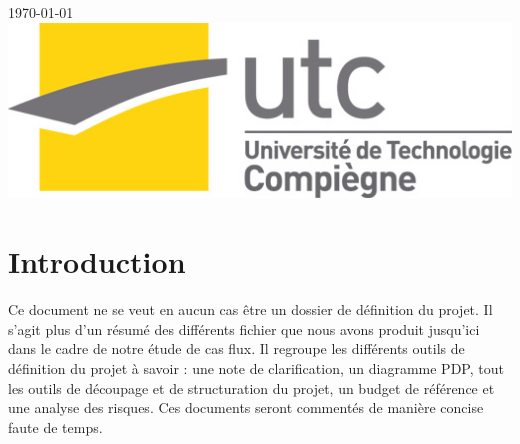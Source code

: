 \documentclass[a4paper, 12pt, leqno]{report}
\theoremstyle{plain}
\begin{document}
\begin{titlepage}


{\large \today}\\[3cm] %


\includegraphics[scale=0.5]{Files/Logo_UTC}\\[1cm] %
 

\vfill %

\end{titlepage}
    \tableofcontents
    \listoffigures
\newpage
\section*{Introduction}
        Ce document ne se veut en aucun cas être un dossier de définition du projet. Il s'agit plus d'un résumé des différents fichier que nous avons produit jusqu'ici dans le cadre de notre étude de cas flux. Il regroupe les différents outils de définition du projet à savoir : une note de clarification, un diagramme PDP, tout les outils de découpage et de structuration du projet, un budget de référence et une analyse des risques. Ces documents seront commentés de manière concise faute de temps.
\end{document}
